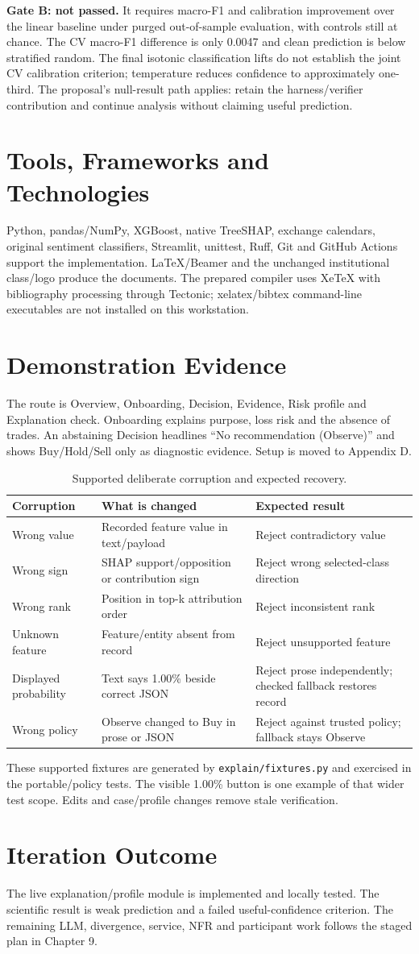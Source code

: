 \textbf{Gate B: not passed.} It requires macro-F1 and calibration improvement over the linear baseline under purged out-of-sample evaluation, with controls still at chance. The CV macro-F1 difference is only 0.0047 and clean prediction is below stratified random. The final isotonic classification lifts do not establish the joint CV calibration criterion; temperature reduces confidence to approximately one-third. The proposal's null-result path applies: retain the harness/verifier contribution and continue analysis without claiming useful prediction.
\section{Tools, Frameworks and Technologies}
Python, pandas/NumPy, XGBoost, native TreeSHAP, exchange calendars, original sentiment classifiers, Streamlit, unittest, Ruff, Git and GitHub Actions support the implementation. LaTeX/Beamer and the unchanged institutional class/logo produce the documents. The prepared compiler uses XeTeX with bibliography processing through Tectonic; xelatex/bibtex command-line executables are not installed on this workstation.
\section{Demonstration Evidence}
\label{chap:manual}
The route is Overview, Onboarding, Decision, Evidence, Risk profile and Explanation check. Onboarding explains purpose, loss risk and the absence of trades. An abstaining Decision headlines ``No recommendation (Observe)'' and shows Buy/Hold/Sell only as diagnostic evidence. Setup is moved to Appendix D.
\begin{longtable}{p{}p{}p{}}
\caption{Supported deliberate corruption and expected recovery.}\label{tab:corruption-demo}\\\toprule Corruption & What is changed & Expected result\\\midrule
Wrong value & Recorded feature value in text/payload & Reject contradictory value\\
Wrong sign & SHAP support/opposition or contribution sign & Reject wrong selected-class direction\\
Wrong rank & Position in top-k attribution order & Reject inconsistent rank\\
Unknown feature & Feature/entity absent from record & Reject unsupported feature\\
Displayed probability & Text says 1.00\% beside correct JSON & Reject prose independently; checked fallback restores record\\
Wrong policy & Observe changed to Buy in prose or JSON & Reject against trusted policy; fallback stays Observe\\
\bottomrule\end{longtable}
These supported fixtures are generated by \nolinkurl{explain/fixtures.py} and exercised in the portable/policy tests. The visible 1.00\% button is one example of that wider test scope. Edits and case/profile changes remove stale verification.

\section{Iteration Outcome}
The live explanation/profile module is implemented and locally tested. The scientific result is weak prediction and a failed useful-confidence criterion. The remaining LLM, divergence, service, NFR and participant work follows the staged plan in Chapter 9.
